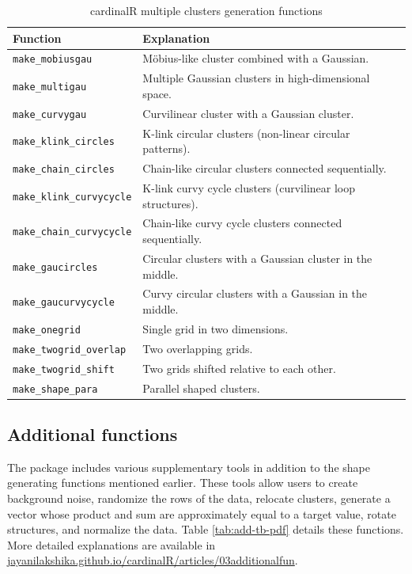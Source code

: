 \begin{table}

\caption{\label{tab:odd-shape-tb-pdf}cardinalR multiple clusters generation functions}
\centering
\begin{tabular}[t]{>{\raggedright\arraybackslash}p{3.5cm}>{\raggedright\arraybackslash}p{8.5cm}}
\toprule
Function & Explanation\\
\midrule
\texttt{make\_mobiusgau} & Möbius-like cluster combined with a Gaussian.\\
\texttt{make\_multigau} & Multiple Gaussian clusters in high-dimensional space.\\
\texttt{make\_curvygau} & Curvilinear cluster with a Gaussian cluster.\\
\texttt{make\_klink\_circles} & K-link circular clusters (non-linear circular patterns).\\
\texttt{make\_chain\_circles} & Chain-like circular clusters connected sequentially.\\
\texttt{make\_klink\_curvycycle} & K-link curvy cycle clusters (curvilinear loop structures).\\
\texttt{make\_chain\_curvycycle} & Chain-like curvy cycle clusters connected sequentially.\\
\texttt{make\_gaucircles} & Circular clusters with a Gaussian cluster in the middle.\\
\texttt{make\_gaucurvycycle} & Curvy circular clusters with a Gaussian in the middle.\\
\texttt{make\_onegrid} & Single grid in two dimensions.\\
\texttt{make\_twogrid\_overlap} & Two overlapping grids.\\
\texttt{make\_twogrid\_shift} & Two grids shifted relative to each other.\\
\texttt{make\_shape\_para} & Parallel shaped clusters.\\
\bottomrule
\end{tabular}
\end{table}

\subsection{Additional functions}\label{additional-functions}

The package includes various supplementary tools in addition to the shape generating functions mentioned earlier. These tools allow users to create background noise, randomize the rows of the data, relocate clusters, generate a vector whose product and sum are approximately equal to a target value, rotate structures, and normalize the data. Table \ref{tab:add-tb-pdf} details these functions. More detailed explanations are available in \href{https://jayanilakshika.github.io/cardinalR/articles/03additionalfun.html}{jayanilakshika.github.io/cardinalR/articles/03additionalfun}.

